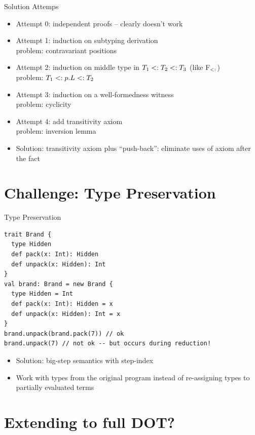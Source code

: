 \documentclass{beamer}
\begin{document}
\begin{frame}[fragile]{Solution Attemps}
\begin{itemize}
\item Attempt 0: independent proofs -- clearly doesn't work
\item Attempt 1: induction on subtyping derivation\\problem: contravariant positions
\item Attempt 2: induction on middle type in $T_1 <: T_2 <: T_3$ (like F$_{<:}$)\\problem: $T_1 <: p.L <: T_2$
\item Attempt 3: induction on a well-formedness witness\\problem: cyclicity
\item Attempt 4: add transitivity axiom\\problem: inversion lemma
\item Solution: transitivity axiom plus ``push-back'': eliminate 
uses of axiom after the fact
\end{itemize}
\end{frame}



\section{Challenge: Type Preservation}
\begin{frame}[fragile]{Type Preservation}
\begin{verbatim}
trait Brand {
  type Hidden
  def pack(x: Int): Hidden
  def unpack(x: Hidden): Int
}
val brand: Brand = new Brand {
  type Hidden = Int
  def pack(x: Int): Hidden = x
  def unpack(x: Hidden): Int = x
}
brand.unpack(brand.pack(7)) // ok
brand.unpack(7) // not ok -- but occurs during reduction!
\end{verbatim}
\begin{itemize}
\item Solution: big-step semantics with step-index
\item Work with types from the original program instead of re-assigning types to partially evaluated terms
\end{itemize}
\end{frame}





\section{Extending to full DOT?}
\end{document}
